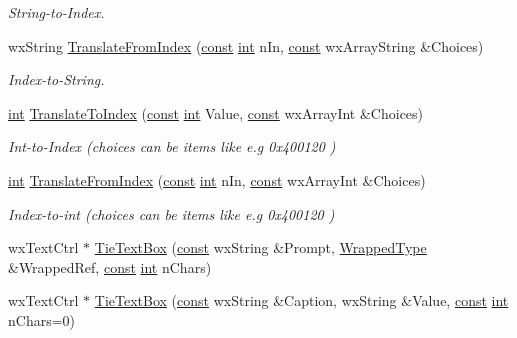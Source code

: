 \begin{DoxyCompactItemize}
\begin{DoxyCompactList}\small\item\em String-\/to-\/\+Index. \end{DoxyCompactList}\item 
wx\+String \hyperlink{class_shuttle_gui_base_ad2ad22607e2d089c717e3d2076969485}{Translate\+From\+Index} (\hyperlink{getopt1_8c_a2c212835823e3c54a8ab6d95c652660e}{const} \hyperlink{xmltok_8h_a5a0d4a5641ce434f1d23533f2b2e6653}{int} n\+In, \hyperlink{getopt1_8c_a2c212835823e3c54a8ab6d95c652660e}{const} wx\+Array\+String \&Choices)
\begin{DoxyCompactList}\small\item\em Index-\/to-\/\+String. \end{DoxyCompactList}\item 
\hyperlink{xmltok_8h_a5a0d4a5641ce434f1d23533f2b2e6653}{int} \hyperlink{class_shuttle_gui_base_a965691f5b1a84abec1ee0c5921ba6432}{Translate\+To\+Index} (\hyperlink{getopt1_8c_a2c212835823e3c54a8ab6d95c652660e}{const} \hyperlink{xmltok_8h_a5a0d4a5641ce434f1d23533f2b2e6653}{int} Value, \hyperlink{getopt1_8c_a2c212835823e3c54a8ab6d95c652660e}{const} wx\+Array\+Int \&Choices)
\begin{DoxyCompactList}\small\item\em Int-\/to-\/\+Index (choices can be items like e.\+g 0x400120 ) \end{DoxyCompactList}\item 
\hyperlink{xmltok_8h_a5a0d4a5641ce434f1d23533f2b2e6653}{int} \hyperlink{class_shuttle_gui_base_aa6ebac87a6cfe9f2a9a0dccdaeaf9b13}{Translate\+From\+Index} (\hyperlink{getopt1_8c_a2c212835823e3c54a8ab6d95c652660e}{const} \hyperlink{xmltok_8h_a5a0d4a5641ce434f1d23533f2b2e6653}{int} n\+In, \hyperlink{getopt1_8c_a2c212835823e3c54a8ab6d95c652660e}{const} wx\+Array\+Int \&Choices)
\begin{DoxyCompactList}\small\item\em Index-\/to-\/int (choices can be items like e.\+g 0x400120 ) \end{DoxyCompactList}\item 
wx\+Text\+Ctrl $\ast$ \hyperlink{class_shuttle_gui_base_ad032b1d630eddfc5e6c169d37157b3b3}{Tie\+Text\+Box} (\hyperlink{getopt1_8c_a2c212835823e3c54a8ab6d95c652660e}{const} wx\+String \&Prompt, \hyperlink{class_wrapped_type}{Wrapped\+Type} \&Wrapped\+Ref, \hyperlink{getopt1_8c_a2c212835823e3c54a8ab6d95c652660e}{const} \hyperlink{xmltok_8h_a5a0d4a5641ce434f1d23533f2b2e6653}{int} n\+Chars)
\item 
wx\+Text\+Ctrl $\ast$ \hyperlink{class_shuttle_gui_base_a80f4887b1318e9349b470cd4e9b065f7}{Tie\+Text\+Box} (\hyperlink{getopt1_8c_a2c212835823e3c54a8ab6d95c652660e}{const} wx\+String \&Caption, wx\+String \&Value, \hyperlink{getopt1_8c_a2c212835823e3c54a8ab6d95c652660e}{const} \hyperlink{xmltok_8h_a5a0d4a5641ce434f1d23533f2b2e6653}{int} n\+Chars=0)

\end{DoxyCompactItemize}
